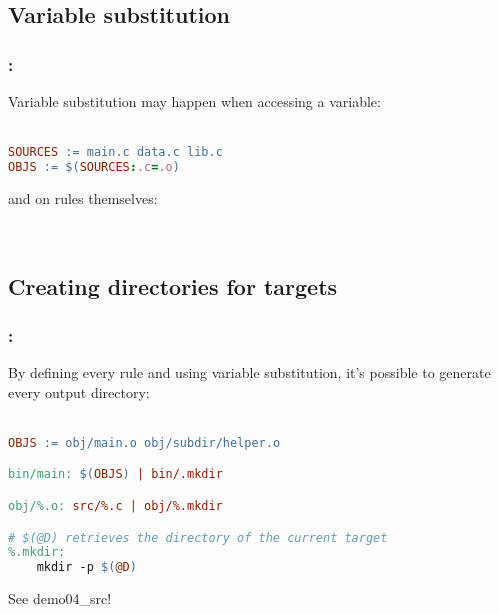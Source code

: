 \subsection{Variable substitution}
\begin{frame}[fragile]
    \frametitle{\secname: \small\subsecname\normalsize}

    Variable substitution may happen when accessing a variable: \\~\\
    \begin{lstlisting}[language=make]
SOURCES := main.c data.c lib.c
OBJS := $(SOURCES:.c=.o)
    \end{lstlisting}

    and on rules themselves: \\~\\
    \begin{lstlisting}[language=make]
%.o: %.c
    \end{lstlisting}

\end{frame}

\subsection{Creating directories for targets}
\begin{frame}[fragile]
    \frametitle{\secname: \small\subsecname\normalsize}

    By defining every rule and using variable substitution, it's possible
    to generate every output directory: \\~\\

    \begin{lstlisting}[language=make]
OBJS := obj/main.o obj/subdir/helper.o

bin/main: $(OBJS) | bin/.mkdir

obj/%.o: src/%.c | obj/%.mkdir

# $(@D) retrieves the directory of the current target
%.mkdir:
    mkdir -p $(@D)
    \end{lstlisting}

    See demo04\_src!
\end{frame}

